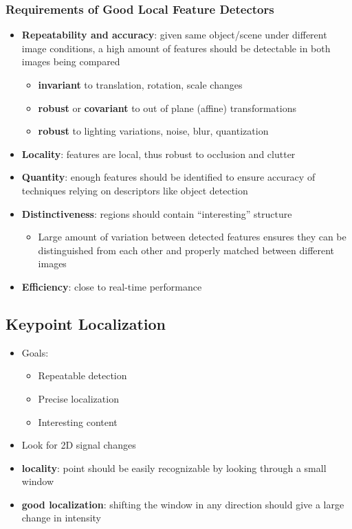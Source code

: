 \documentclass[letterpaper,12pt]{article}
\begin{document}
\subsubsection{Requirements of Good Local Feature Detectors}
\begin{itemize}
 \item \textbf{Repeatability and accuracy}: given same object/scene under different image conditions, a high amount of features should be detectable in both images being compared
       \begin{itemize}
        \item \textbf{invariant} to translation, rotation, scale changes
        \item \textbf{robust} or \textbf{covariant} to out of plane (affine) transformations
        \item \textbf{robust} to lighting variations, noise, blur, quantization
       \end{itemize}
 \item \textbf{Locality}: features are local, thus robust to occlusion and clutter
 \item \textbf{Quantity}: enough features should be identified to ensure accuracy of techniques relying on descriptors like object detection
 \item \textbf{Distinctiveness}: regions should contain ``interesting'' structure
       \begin{itemize}
        \item Large amount of variation between detected features ensures they can be distinguished from each other and properly matched between different images
       \end{itemize}
 \item \textbf{Efficiency}: close to real-time performance
\end{itemize}

\subsection{Keypoint Localization}
\begin{itemize}
 \item Goals:
       \begin{itemize}
        \item Repeatable detection
        \item Precise localization
        \item Interesting content
       \end{itemize}
 \item Look for 2D signal changes
 \item \textbf{locality}: point should be easily recognizable by looking through a small window
 \item \textbf{good localization}: shifting the window in any direction should give a large change in intensity
\end{itemize}
\end{document}
